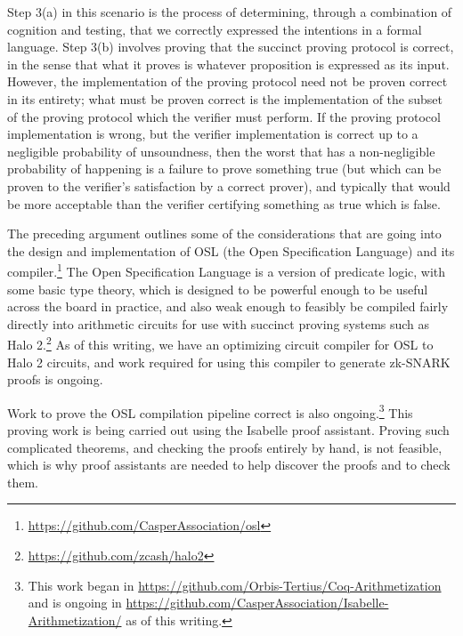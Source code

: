 \documentclass[11pt]{article}
\begin{document}
Step 3(a) in this scenario is the process of determining,
through a combination of cognition and testing, that we correctly expressed the
intentions in a formal language. Step 3(b) involves proving that the succinct
proving protocol is correct, in the sense that what it proves is whatever proposition
is expressed as its input. However, the implementation of the proving protocol need
not be proven correct in its entirety; what must be proven correct is the implementation
of the subset of the proving protocol which the verifier must perform. If the proving
protocol implementation is wrong, but the verifier implementation is correct up to a
negligible probability of unsoundness, then the worst that has a non-negligible probability
of happening is a failure to prove something true (but which can be proven to the
verifier's satisfaction by a correct prover), and typically that would be more acceptable than
the verifier certifying something as true which is false.

The preceding argument outlines some of the considerations that are going into the
design and implementation of OSL (the Open Specification Language) and its
compiler.\footnote{\url{https://github.com/CasperAssociation/osl}}
The Open Specification Language is a version of predicate logic, with some basic type theory,
which is designed to be powerful enough to be useful across the board in practice, and also weak enough
to feasibly be compiled fairly directly into arithmetic circuits
for use with succinct proving systems such as Halo 2.\footnote{\url{https://github.com/zcash/halo2}}
As of this writing, we have an optimizing circuit compiler for OSL to Halo 2 circuits,
and work required for using this compiler to generate zk-SNARK proofs is ongoing.

Work to prove the OSL compilation pipeline correct is also ongoing.\footnote{This work began in
\url{https://github.com/Orbis-Tertius/Coq-Arithmetization} and is ongoing in
\url{https://github.com/CasperAssociation/Isabelle-Arithmetization/} as of this writing.}
This proving work is being carried out using the Isabelle proof assistant. Proving such complicated
theorems, and checking the proofs entirely by hand, is not feasible, which is why proof
assistants are needed to help discover the proofs and to check them.
\end{document}
